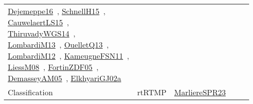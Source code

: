 {\begin{longtable}{lp{3cm}>{\raggedright\arraybackslash}p{6cm}>{\raggedright\arraybackslash}p{6cm}>{\raggedright\arraybackslash}p{8cm}}
\href{../works/Dejemeppe16.pdf}{Dejemeppe16}~\cite{Dejemeppe16}, \href{../works/SchnellH15.pdf}{SchnellH15}~\cite{SchnellH15}, \href{../works/CauwelaertLS15.pdf}{CauwelaertLS15}~\cite{CauwelaertLS15}, \href{../works/ThiruvadyWGS14.pdf}{ThiruvadyWGS14}~\cite{ThiruvadyWGS14}, \href{../works/LombardiM13.pdf}{LombardiM13}~\cite{LombardiM13}, \href{../works/OuelletQ13.pdf}{OuelletQ13}~\cite{OuelletQ13}, \href{../works/LombardiM12.pdf}{LombardiM12}~\cite{LombardiM12}, \href{../works/KameugneFSN11.pdf}{KameugneFSN11}~\cite{KameugneFSN11}, \href{../works/LiessM08.pdf}{LiessM08}~\cite{LiessM08}, \href{../works/FortinZDF05.pdf}{FortinZDF05}~\cite{FortinZDF05}, \href{../works/DemasseyAM05.pdf}{DemasseyAM05}~\cite{DemasseyAM05}, \href{../works/ElkhyariGJ02a.pdf}{ElkhyariGJ02a}~\cite{ElkhyariGJ02a}\\
Classification & rtRTMP & \href{../works/MarliereSPR23.pdf}{MarliereSPR23}~\cite{MarliereSPR23} &  & \\

\end{longtable}}
